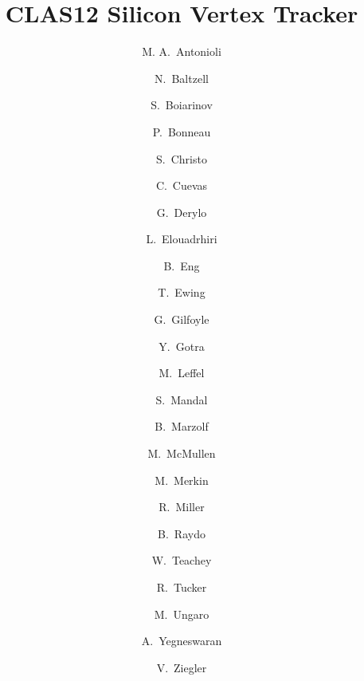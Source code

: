 \title{CLAS12 Silicon Vertex Tracker}

\author[A]{M. A.~Antonioli}
\author[A]{N.~Baltzell}
\author[A]{S.~Boiarinov}
\author[A]{P.~Bonneau}
\author[A]{S.~Christo}
\author[A]{C.~Cuevas}
\author[B]{G.~Derylo}
\author[A]{L.~Elouadrhiri}
\author[A]{B.~Eng}
\author[A]{T.~Ewing}
\author[C]{G.~Gilfoyle}
\author[A]{Y.~Gotra}
\author[A]{M.~Leffel}
\author[A]{S.~Mandal}
\author[A]{B.~Marzolf}
\author[A]{M.~McMullen}
\author[D]{M.~Merkin}
\author[A]{R.~Miller}
\author[A]{B.~Raydo}
\author[A]{W.~Teachey}
\author[E]{R.~Tucker}
\author[A]{M.~Ungaro}
\author[A]{A.~Yegneswaran}
\author[A]{V.~Ziegler}

\address[A]{Thomas Jefferson National Accelerator Facility, Newport News, VA, USA}
\address[B]{Fermi National Accelerator Laboratory, Batavia, IL, USA}
\address[C]{University of Richmond, Richmond, VA, USA}
\address[D]{Skobeltsyn Institute of Nuclear Physics, Moscow State University, Moscow, Russia}
\address[E]{Arizona State University, Tempe, AZ}

